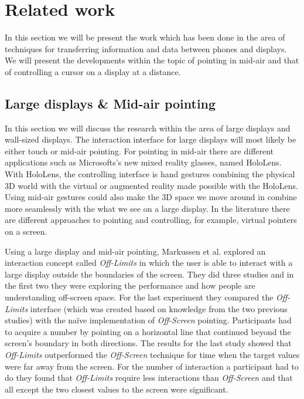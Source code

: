 \section{Related work} \label{sec:relatedwork}
In this section we will be present the work which has been done in the area of techniques for transferring information and data between phones and displays.
We will present the developments within the topic of pointing in mid-air and that of controlling a cursor on a display at a distance.

\subsection{Large displays \& Mid-air pointing} \label{sec:largeDisplayAirPointing}
In this section we will discuss the research within the area of large displays and wall-sized displays.
The interaction interface for large displays will most likely be either touch or mid-air pointing.
For pointing in mid-air there are different applications such as Microsofts's new mixed reality glasses, named HoloLens.
With HoloLens, the controlling interface is hand gestures combining the physical 3D world with the virtual or augmented reality made possible with the HoloLens.
Using mid-air gestures could also make the 3D space we move around in combine more seamlessly with the what we see on a large display.
In the literature there are different approaches to pointing and controlling, for example, virtual pointers on a screen. 

Using a large display and mid-air pointing, Markussen et al. \cite{Markussen:2016} explored an interaction concept called \emph{Off-Limits} in which the user is able to interact with a large display outside the boundaries of the screen.
They did three studies and in the first two they were exploring the performance and how people are understanding off-screen space.
For the last experiment they compared the \emph{Off-Limits} interface (which was created based on knowledge from the two previous studies) with the naïve implementation of \emph{Off-Screen} pointing.
Participants had to acquire a number by pointing on a horizontal line that continued beyond the screen's boundary in both directions.
The results for the last study showed that \emph{Off-Limits} outperformed the \emph{Off-Screen} technique for time when the target values were far away from the screen.
For the number of interaction a participant had to do they found that \emph{Off-Limits} require less interactions than \emph{Off-Screen} and that all except the two closest values to the screen were significant.

